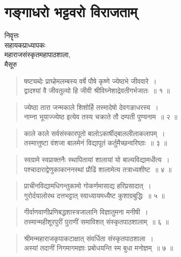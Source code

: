 \chapter{गङ्गाधरो भट्टवरो विराजताम्}

\begin{center}
\smallskip

निवॄत्तः\\ 
सहायकप्राध्यापकः\\ 
महाराजसंस्कृतमहापाठशाला,\\ 
मैसूरु
\end{center}

\begin{verse}
षष्ट्यब्देः प्राघ्हेमलम्बस्य वर्षे पौषे कृष्णे ज्येष्ठभे जीववारे~।\\
द्वादश्यां वै जीवतुल्यो हि जीवी श्रीविघ्नेशाद्रेवतीगर्भजातः~॥ १ ॥
\end{verse}

\begin{verse}
ज्येष्ठा तारा जन्मकाले शिशोर्हि तस्मादेषो देवगङाधरस्य~।\\
नाम्ना भूयाज्ज्येष्ठ इत्येव तस्य चक्राते तौ दम्पती पुण्यनाम~॥ २ ॥
\end{verse}

\begin{verse}
काले काले सर्वसंस्कारपूतो बालोऽकार्षीद्बाललीलाकलापम्~।\\
तस्मात्तुष्टा वंशजा बालमेनं विद्यापूतं कर्तुमैच्छन्वरिष्ठाः~॥ ३ ॥
\end{verse}

\begin{verse}
स्वग्रामे स्वप्राक्तनैः स्थापितायां शालायां यो बाल्यविद्यामधीत्य~।\\
पश्चादाराद्वेणुकाकाननस्थां प्रौढिं शालामेत्य तत्राध्यशीष्ट~॥ ४ ॥
\end{verse}

\begin{verse}
प्राचीनविद्यामधिगन्तुकामो गोकर्णमासाद्य हरिप्रसादात्~।\\
गुरोर्दयालोरथ दत्तभट्टात् स्वाध्यायमध्यैष्ट कुशाग्रबुद्धिः~॥ ५ ॥
\end{verse}

\begin{verse}
गीर्वाणवाणीप्रणिबद्धशास्त्रजालानि विज्ञातुमना मनीषी~।\\
तस्मान्महीशूरपुरीं पुराणीं समाविशत् संस्कृतपाठशालाम्~॥ ६ ॥
\end{verse}

\begin{verse}
श्रीमन्महाराजकृपाकटाक्षात् संवर्धिता संस्कृतपाठशाला~।\\
अस्यां तदानीं निगमागमज्ञाः प्रबोधयन्ति स्म बुधा मनोज्ञम्~॥ ७ ॥
\end{verse}

